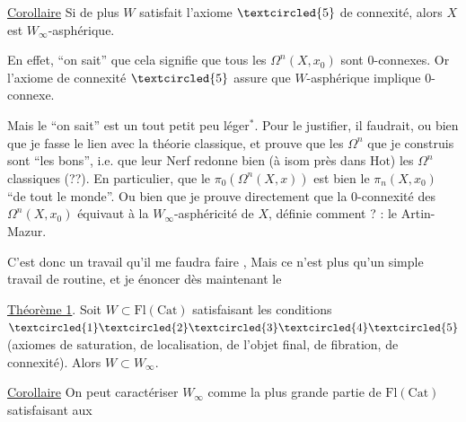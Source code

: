 \uline{Corollaire} Si de plus $W$ satisfait l'axiome $\textcircled{5}$ de connexité, alors $X$ est  $W_\infty$-asphérique.

En effet, ``on sait'' que cela signifie que tous les $\Omega^n(X,x_0)$ sont $0$-connexes. Or l'axiome de connexité $\textcircled{5}$ assure que $W$-asphérique implique $0$-connexe.


Mais le ``on sait'' est un tout petit peu léger$^*$. Pour le justifier, il faudrait, ou bien que je fasse le lien avec la théorie  classique, et prouve que les $\Omega^n$ que je construis sont ``les bons'', i.e. que leur Nerf redonne bien (à isom près dans $\mathrm{Hot}$) les $\Omega^n$ classiques (??). En particulier, que le $\pi_0(\Omega^n(X,x))$ est bien le $\pi_n(X,x_0)$ ``de tout le monde''. Ou bien que je prouve directement que la $0$-connexité des \unsure{\S} $\Omega^n(X,x_0)$ équivaut à la $W_\infty$-asphéricité de $X$, définie comment ?  : le Artin-Mazur.

C'est donc un travail qu'il me faudra faire , Mais ce n'est plus qu'un simple travail de routine, et je  énoncer dès maintenant le



\uline{Théorème 1}. Soit $W\subset\mathrm{Fl}(\mathrm{Cat})$ satisfaisant les conditions $\textcircled{1}\textcircled{2}\textcircled{3}\textcircled{4}\textcircled{5}$ (axiomes de saturation, de localisation, de l'objet final, de fibration, de connexité). Alors $W\subset W_\infty$.


\uline{Corollaire} On peut caractériser $W_\infty$ comme la plus grande partie de $\mathrm{Fl}(\mathrm{Cat})$ satisfaisant aux


